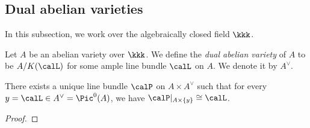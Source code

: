 

\subsection{Dual abelian varieties}

    In this subsection, we work over the algebraically closed field \(\kkk\).


    \begin{definition}\label{def:dual_abelian_variety}
        Let \(A\) be an abelian variety over \(\kkk\).
        We define the \emph{dual abelian variety} of \(A\) to be \(A/K(\calL)\) for some ample line bundle \(\calL\) on \(A\).
        We denote it by \(A^\vee\).
    \end{definition}


    \begin{lemma}\label{prop: the Poincare line bundle}
        There exists a unique line bundle \(\calP\) on \(A \times A^\vee\) such that for every \(y = \calL \in A^\vee = \Pic^0(A)\), we have \(\calP|_{A \times \{y\}} \cong \calL\).
    \end{lemma}
    \begin{proof}
    \end{proof}

